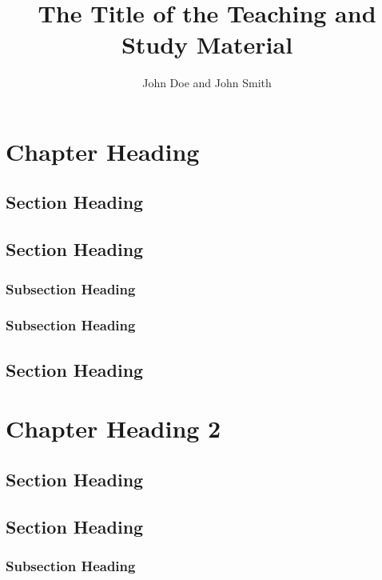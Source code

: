 \documentclass[teachingmaterial]{aaltoseries}
\author{John Doe and John Smith}
\title{The Title of the Teaching and Study Material}
\begin{document}
\draftabstract{\lipsum[1-3]}

\begin{preface}%
\lipsum[1-4]
\end{preface}

\tableofcontents

\chapter{Chapter Heading}
\section{Section Heading}
\lipsum[1-4]
\section{Section Heading}
\lipsum[5-6]
\subsection{Subsection Heading}
\lipsum[7-8]
\subsection{Subsection Heading}
\lipsum[9-10]
\section{Section Heading}
\lipsum[11-12]

\chapter{Chapter Heading 2}
\section{Section Heading}
\lipsum[1-4]
\section{Section Heading}
\lipsum[5-6]
\subsection{Subsection Heading}
\lipsum[7-8]
\end{document}
